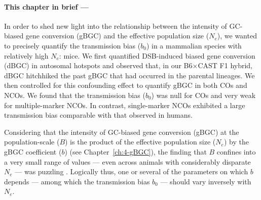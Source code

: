 {\small{} \itshape{}

\paragraph{This chapter in brief —}

In order to shed new light into the relationship between the intensity of GC-biased gene conversion (gBGC) and the effective population size ($N_e$), we wanted to precisely quantify the transmission bias ($b_0$) in a mammalian species with relatively high $N_e$: mice.
We first quantified DSB-induced biased gene conversion (dBGC) in autosomal hotspots and observed that, in our B6$\times{}$CAST F1 hybrid, dBGC hitchhiked the past gBGC that had occurred in the parental lineages.
We then controlled for this confounding effect to quantify gBGC in both COs and NCOs.
We found that the transmission bias ($b_0$) was null for COs and very weak for multiple-marker NCOs. 
In contrast, single-marker NCOs exhibited a large transmission bias comparable with that observed in humans.



}

\newpage

Considering that the intensity of GC-biased gene conversion (gBGC) at the population-scale ($B$) is the product of the effective population size ($N_e$) by the gBGC coefficient ($b$) (see Chapter~\ref{ch:4-gBGC}), the finding that $B$ confines into a very small range of values — even across animals with considerably disparate $N_e$ — was puzzling \citep{galtier2018codon}.
Logically thus, one or several of the parameters on which $b$ depends — among which the transmission bias $b_0$ — should vary inversely with $N_e$.

